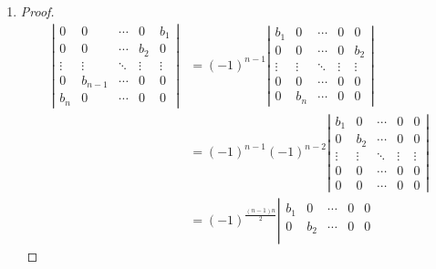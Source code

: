 \begin{enumerate}
\begin{proof}
        \end{proof}
    \item %
        \begin{proof}
            \begin{align*}
                \left|
                    \begin{array}{ccccc}
                        0 & 0 & \cdots & 0 & b_1 \\
                        0 & 0 & \cdots & b_2 & 0 \\
                        \vdots & \vdots & \ddots & \vdots & \vdots \\
                        0 & b_{n-1} & \cdots & 0 & 0 \\
                        b_n & 0 & \cdots & 0 & 0
                    \end{array}
                \right|
                &= (-1)^{n-1}
                \left|
                    \begin{array}{ccccc}
                        b_1 & 0 & \cdots & 0 & 0 \\
                        0 & 0 & \cdots & 0 & b_2 \\
                        \vdots & \vdots & \ddots & \vdots & \vdots \\
                        0 & 0 & \cdots & 0 & 0 \\
                        0 & b_n & \cdots & 0 & 0
                    \end{array}
                \right| \\
                &= (-1)^{n-1}(-1)^{n-2} 
                \left|
                    \begin{array}{ccccc}
                        b_1 & 0 & \cdots & 0 & 0 \\
                        0 & b_2 & \cdots & 0 & 0 \\
                        \vdots & \vdots & \ddots & \vdots & \vdots \\
                        0 & 0 & \cdots & 0 & 0 \\
                        0 & 0 & \cdots & 0 & 0
                    \end{array}
                \right| \\
                &= (-1)^{\frac{(n-1)n}{2}}
                \left|
                    \begin{array}{ccccc}
                        b_1 & 0 & \cdots & 0 & 0 \\
                        0 & b_2 & \cdots & 0 & 0 \\

\end{array}
\end{align*}
\end{proof}
\end{enumerate}
